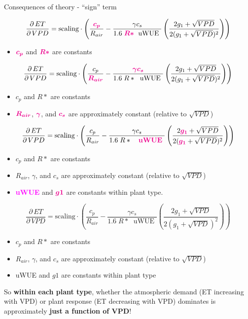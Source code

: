 \documentclass[aspectratio=169]{beamer}
\begin{document}
\begin{frame}{Consequences of theory - ``sign'' term}
  \begin{overprint}
    \[\frac{\partial \, ET}{\partial \, VPD} = \text{scaling} \cdot \left(\frac{\textcolor{magenta}{\boldsymbol{ c_p}}}{R_{air}} - \frac{\gamma c_s }{1.6 \; \textcolor{magenta}{\boldsymbol{R*}}\; \text{ uWUE }} \left( \frac{2 g_1 + \sqrt{VPD}}{2 (g_1 + \sqrt{VPD})^2}\right) \right)\]
    \begin{itemize}
    \item $\textcolor{magenta}{\boldsymbol{c_p}}$ and $\textcolor{magenta}{\boldsymbol{R*}}$ are constants
    \end{itemize}
    \[\frac{\partial \, ET}{\partial \, VPD} = \text{scaling} \cdot \left(\frac{ c_p}{\textcolor{magenta}{\boldsymbol{R_{air}}}} - \frac{\textcolor{magenta}{\boldsymbol{\gamma c_s}} }{1.6 \; R*\; \text{ uWUE }} \left( \frac{2 g_1 + \sqrt{VPD}}{2 (g_1 + \sqrt{VPD})^2}\right) \right)\]
    \begin{itemize}
    \item $c_p$ and $R*$ are constants
    \item $\textcolor{magenta}{\boldsymbol{R_{air}}}$, $\textcolor{magenta}{\boldsymbol{\gamma}}$, and $\textcolor{magenta}{\boldsymbol{c_s}}$ are approximately constant (relative to $\sqrt{VPD}$)
    \end{itemize}
    \[\frac{\partial \, ET}{\partial \, VPD} = \text{scaling} \cdot \left(\frac{ c_p}{R_{air}} - \frac{\gamma c_s }{1.6 \; R*\; \text{ \textcolor{magenta}{\textbf{ uWUE}} }} \left( \frac{2  \textcolor{magenta}{\boldsymbol{g_1}} + \sqrt{VPD}}{2 ( \textcolor{magenta}{\boldsymbol{g_1}} + \sqrt{VPD})^2}\right) \right)\]

    \begin{itemize}
    \item $c_p$ and $R*$ are constants
    \item $R_{air}$, $\gamma$, and $c_s$ are approximately constant (relative to $\sqrt{VPD}$)
    \item \textcolor{magenta}{\textbf{uWUE}} and $\textcolor{magenta}{\boldsymbol{g1}}$ are constants within plant type.
    \end{itemize}
    \[\frac{\partial \, ET}{\partial \, VPD} = \text{scaling} \cdot \left(\frac{ c_p}{R_{air}} - \frac{\gamma c_s }{1.6 \; R*\; \text{ uWUE }} \left( \frac{2 g_1 + \sqrt{VPD}}{2 (g_1 + \sqrt{VPD})^2}\right) \right)\]

    \begin{itemize}
    \item $c_p$ and $R*$ are constants
    \item $R_{air}$, $\gamma$, and $c_s$ are approximately constant (relative to $\sqrt{VPD}$)
    \item uWUE and $g1$ are constants within plant type
    \end{itemize}
    So \textbf{within each plant type}, whether the atmospheric demand (ET increasing with VPD) or plant response (ET decreasing with VPD) dominates is approximately \textbf{just a function of VPD}!
  \end{overprint}    
\end{frame}
\end{document}
